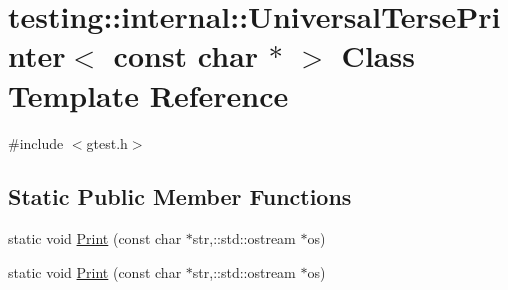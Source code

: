 \hypertarget{classtesting_1_1internal_1_1_universal_terse_printer_3_01const_01char_01_5_01_4}{\section{testing\-:\-:internal\-:\-:Universal\-Terse\-Printer$<$ const char $\ast$ $>$ Class Template Reference}
\label{classtesting_1_1internal_1_1_universal_terse_printer_3_01const_01char_01_5_01_4}
}


{\ttfamily \#include $<$gtest.\-h$>$}

\subsection*{Static Public Member Functions}
\begin{DoxyCompactItemize}
\item 
static void \hyperlink{classtesting_1_1internal_1_1_universal_terse_printer_3_01const_01char_01_5_01_4_aa7bc28677539f2f151e8fbcd9c573655}{Print} (const char $\ast$str,\-::std\-::ostream $\ast$os)
\item 
static void \hyperlink{classtesting_1_1internal_1_1_universal_terse_printer_3_01const_01char_01_5_01_4_aa7bc28677539f2f151e8fbcd9c573655}{Print} (const char $\ast$str,\-::std\-::ostream $\ast$os)
\end{DoxyCompactItemize}


